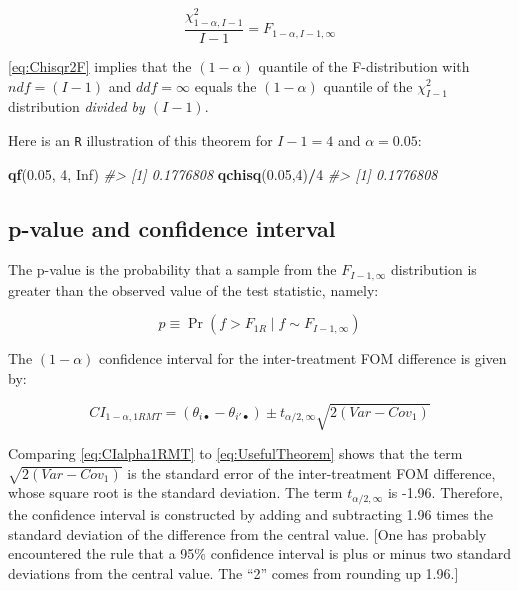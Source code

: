 \documentclass[
]{book}
\newenvironment{Shaded}{\begin{snugshade}}{\end{snugshade}}
\newcommand{\CommentTok}[1]{\textcolor[rgb]{0.56,0.35,0.01}{\textit{#1}}}
\newcommand{\DecValTok}[1]{\textcolor[rgb]{0.00,0.00,0.81}{#1}}
\newcommand{\FloatTok}[1]{\textcolor[rgb]{0.00,0.00,0.81}{#1}}
\newcommand{\KeywordTok}[1]{\textcolor[rgb]{0.13,0.29,0.53}{\textbf{#1}}}
\newcommand{\NormalTok}[1]{#1}
\newcommand{\OperatorTok}[1]{\textcolor[rgb]{0.81,0.36,0.00}{\textbf{#1}}}
\newcommand{\OtherTok}[1]{\textcolor[rgb]{0.56,0.35,0.01}{#1}}
\begin{document}
\begin{equation}
\frac{\chi_{1-\alpha,I-1}^{2}}{I-1} = F_{1-\alpha,I-1,\infty}
\label{eq:Chisqr2F}
\end{equation}

\eqref{eq:Chisqr2F} implies that the \((1-\alpha)\) quantile of the F-distribution with \(ndf=(I-1)\) and \(ddf=\infty\) equals the \((1-\alpha)\) quantile of the \(\chi_{I-1}^2\) distribution \emph{divided by \((I-1)\)}.

Here is an \texttt{R} illustration of this theorem for \(I-1 = 4\) and \(\alpha = 0.05\):

\begin{Shaded}
\begin{Highlighting}[]
\KeywordTok{qf}\NormalTok{(}\FloatTok{0.05}\NormalTok{, }\DecValTok{4}\NormalTok{, }\OtherTok{Inf}\NormalTok{)}
\CommentTok{\#\textgreater{} [1] 0.1776808}
\KeywordTok{qchisq}\NormalTok{(}\FloatTok{0.05}\NormalTok{,}\DecValTok{4}\NormalTok{)}\OperatorTok{/}\DecValTok{4}
\CommentTok{\#\textgreater{} [1] 0.1776808}
\end{Highlighting}
\end{Shaded}

\hypertarget{p-value-and-confidence-interval-1}{%
\subsection{p-value and confidence interval}\label{p-value-and-confidence-interval-1}}

The p-value is the probability that a sample from the \(F_{I-1,\infty}\) distribution is greater than the observed value of the test statistic, namely:

\begin{equation}
p\equiv \Pr(f>F_{1R} \mid f \sim F_{I-1,\infty})
\label{eq:pValue1RMT}
\end{equation}

The \((1-\alpha)\) confidence interval for the inter-treatment FOM difference is given by:

\begin{equation}
CI_{1-\alpha,1RMT} = (\theta_{i\bullet} - \theta_{i'\bullet}) \pm t_{\alpha/2,\infty} \sqrt{2(Var-Cov_1)}
\label{eq:CIalpha1RMT}
\end{equation}

Comparing \eqref{eq:CIalpha1RMT} to \eqref{eq:UsefulTheorem} shows that the term \(\sqrt{2(Var-Cov_1)}\) is the standard error of the inter-treatment FOM difference, whose square root is the standard deviation. The term \(t_{\alpha/2,\infty}\) is -1.96. Therefore, the confidence interval is constructed by adding and subtracting 1.96 times the standard deviation of the difference from the central value. {[}One has probably encountered the rule that a 95\% confidence interval is plus or minus two standard deviations from the central value. The ``2'' comes from rounding up 1.96.{]}
\end{document}
